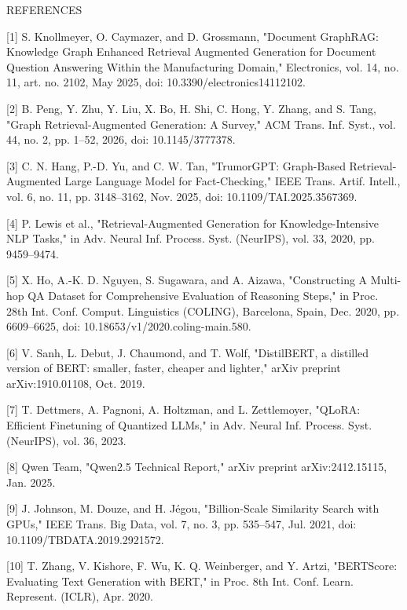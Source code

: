 \textsc{REFERENCES}

{[}1{]} S. Knollmeyer, O. Caymazer, and D. Grossmann, "Document
GraphRAG: Knowledge Graph Enhanced Retrieval Augmented Generation for
Document Question Answering Within the Manufacturing Domain,"
Electronics, vol. 14, no. 11, art. no. 2102, May 2025, doi:
10.3390/electronics14112102.

{[}2{]} B. Peng, Y. Zhu, Y. Liu, X. Bo, H. Shi, C. Hong, Y. Zhang, and
S. Tang, "Graph Retrieval-Augmented Generation: A Survey," ACM Trans.
Inf. Syst., vol. 44, no. 2, pp. 1--52, 2026, doi: 10.1145/3777378.

{[}3{]} C. N. Hang, P.-D. Yu, and C. W. Tan, "TrumorGPT: Graph-Based
Retrieval-Augmented Large Language Model for Fact-Checking," IEEE Trans.
Artif. Intell., vol. 6, no. 11, pp. 3148--3162, Nov. 2025, doi:
10.1109/TAI.2025.3567369.

{[}4{]} P. Lewis et al., "Retrieval-Augmented Generation for
Knowledge-Intensive NLP Tasks," in Adv. Neural Inf. Process. Syst.
(NeurIPS), vol. 33, 2020, pp. 9459--9474.

{[}5{]} X. Ho, A.-K. D. Nguyen, S. Sugawara, and A. Aizawa,
"Constructing A Multi-hop QA Dataset for Comprehensive Evaluation of
Reasoning Steps," in Proc. 28th Int. Conf. Comput. Linguistics (COLING),
Barcelona, Spain, Dec. 2020, pp. 6609--6625, doi:
10.18653/v1/2020.coling-main.580.

{[}6{]} V. Sanh, L. Debut, J. Chaumond, and T. Wolf, "DistilBERT, a
distilled version of BERT: smaller, faster, cheaper and lighter," arXiv
preprint arXiv:1910.01108, Oct. 2019.

{[}7{]} T. Dettmers, A. Pagnoni, A. Holtzman, and L. Zettlemoyer,
"QLoRA: Efficient Finetuning of Quantized LLMs," in Adv. Neural Inf.
Process. Syst. (NeurIPS), vol. 36, 2023.

{[}8{]} Qwen Team, "Qwen2.5 Technical Report," arXiv preprint
arXiv:2412.15115, Jan. 2025.

{[}9{]} J. Johnson, M. Douze, and H. Jégou, "Billion-Scale Similarity
Search with GPUs," IEEE Trans. Big Data, vol. 7, no. 3, pp. 535--547,
Jul. 2021, doi: 10.1109/TBDATA.2019.2921572.

{[}10{]} T. Zhang, V. Kishore, F. Wu, K. Q. Weinberger, and Y. Artzi,
"BERTScore: Evaluating Text Generation with BERT," in Proc. 8th Int.
Conf. Learn. Represent. (ICLR), Apr. 2020.
